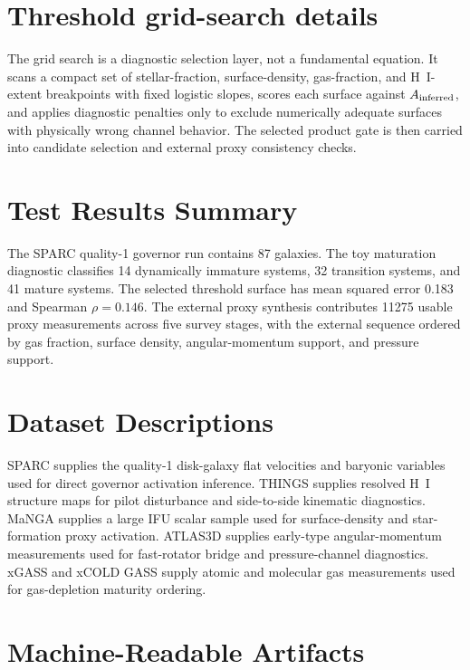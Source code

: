 \documentclass[11pt]{article}
\begin{document}
\clearpage
\appendix

\section{Threshold grid-search details}

The grid search is a diagnostic selection layer, not a fundamental equation. It scans a compact set of stellar-fraction, surface-density, gas-fraction, and H~I-extent breakpoints with fixed logistic slopes, scores each surface against $A_{\rm inferred}$, and applies diagnostic penalties only to exclude numerically adequate surfaces with physically wrong channel behavior. The selected product gate is then carried into candidate selection and external proxy consistency checks.

\section{Test Results Summary}

The SPARC quality-1 governor run contains 87 galaxies. The toy maturation diagnostic classifies 14 dynamically immature systems, 32 transition systems, and 41 mature systems. The selected threshold surface has mean squared error 0.183 and Spearman $\rho=0.146$. The external proxy synthesis contributes 11275 usable proxy measurements across five survey stages, with the external sequence ordered by gas fraction, surface density, angular-momentum support, and pressure support.

\section{Dataset Descriptions}

SPARC supplies the quality-1 disk-galaxy flat velocities and baryonic variables used for direct governor activation inference. THINGS supplies resolved H~I structure maps for pilot disturbance and side-to-side kinematic diagnostics. MaNGA supplies a large IFU scalar sample used for surface-density and star-formation proxy activation. ATLAS3D supplies early-type angular-momentum measurements used for fast-rotator bridge and pressure-channel diagnostics. xGASS and xCOLD GASS supply atomic and molecular gas measurements used for gas-depletion maturity ordering.

\section{Machine-Readable Artifacts}
\end{document}
